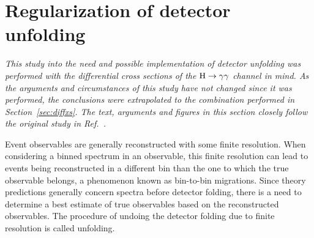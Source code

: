 \section{Regularization of detector unfolding}
\label{sec:regularization}

\emph{
This study into the need and possible implementation of detector unfolding was performed with the differential cross sections of the $\mathrm{H}\to\mathrm{\gamma}\mathrm{\gamma}$ channel in mind.
% 
As the arguments and circumstances of this study have not changed since it was performed, the conclusions were extrapolated to the combination performed in Section~\ref{sec:diffxs}.
% 
The text, arguments and figures in this section closely follow the original study in Ref.~\cite{AN-17-041}.
}

Event observables are generally reconstructed with some finite resolution.
% 
When considering a binned spectrum in an observable, this finite resolution can lead to events being reconstructed in a different bin than the one to which the true observable belongs, a phenomenon known as bin-to-bin migrations.
% 
Since theory predictions generally concern spectra before detector folding, there is a need to determine a best estimate of true observables based on the reconstructed observables.
% 
The procedure of undoing the detector folding due to finite resolution is called unfolding.


